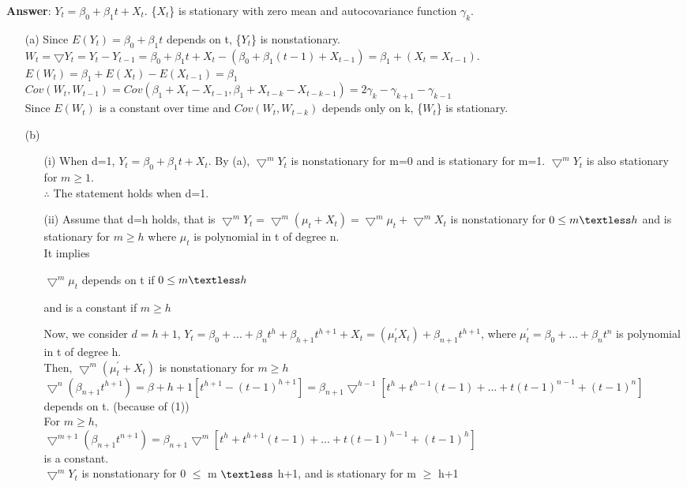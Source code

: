 {\bf Answer}:
$Y_t=\beta_0+\beta_1 t+X_t$.  \{$X_t$\} is stationary with zero mean and autocovariance function $\gamma_k$.
  \begin{itemize}
  \item[(a)] Since $E(Y_t)=\beta_0+\beta_1 t$ depends on t, \{$Y_t$\} is nonstationary.\\
  $W_t=\bigtriangledown Y_t=Y_t-Y_{t-1}=\beta_0+\beta_1 t+X_t-(\beta_0+\beta_1(t-1)+X_{t-1})=\beta_1+(X_t=X_{t-1})$.\\
  $E(W_t)=\beta_1+E(X_t)-E(X_{t-1})=\beta_1$\\
  $Cov(W_t,W_{t-1})=Cov(\beta_1+X_t-X_{t-1},\beta_1+X_{t-k}-X_{t-k-1})=2\gamma_k-\gamma_{k+1}-\gamma_{k-1}$\\

  Since $E(W_t)$ is a constant over time and $Cov(W_t,W_{t-k})$ depends only on k, \{$W_t$\} is stationary.
  
  \item[(b)]
  \begin{itemize}
  \item[(i)] When d=1, $Y_t=\beta_0+\beta_1 t+X_t$. By (a), $\bigtriangledown^{m} Y_t$ is nonstationary for m=0 and is stationary for m=1. $\bigtriangledown^{m} Y_t$ is also stationary for $m \geq 1$.\\  
  $\therefore$ The statement holds when d=1.
  
  \item[(ii)] Assume that d=h holds, that is $\bigtriangledown^{m} Y_t=\bigtriangledown^{m}(\mu_t+X_t)=\bigtriangledown^{m}\mu_t+\bigtriangledown^{m} X_t$ is nonstationary for $0 \leq m \textless h$ and is stationary for $m \geq h$ where $\mu_t$ is polynomial in t of degree n.\\  
  It implies
 	\begin{center}
 	    $\bigtriangledown^{m}\mu_t$  
 	depends on t if $0 \leq m \textless h$
    \end{center}
    \begin{center}
 		and is a constant if $m \geq h$ 
 	\end{center}
 	Now, we consider $d=h+1$, $Y_t=\beta_0+...+\beta_n t^{h}+\beta_{h+1} t^{h+1}+X_t=(\mu_t^{'} X_t)+\beta_{n+1} t^{h+1}$, where $\mu_t^{'}=\beta_0+...+\beta_n t^{n}$ is polynomial in t of degree h.\\  
 	Then, $\bigtriangledown^{m}(\mu_t^{'}+X_t)$ is nonstationary for $ m \geq h $ \\ 
 	$\bigtriangledown^{n}(\beta_{n+1} t^{h+1})=\beta+{h+1}[t^{h+1}-(t-1)^{h+1}]=\beta_{n+1}\bigtriangledown^{h-1}[t^{h}+t^{h-1}(t-1)+...
 	+t (t-1)^{n-1}+(t-1)^{n}]$  depends on t. (because of (1)) \\
 	For $m \geq h $,\\
 	$\bigtriangledown^{m+1}(\beta_{n+1} t^{n+1})=\beta_{n+1} \bigtriangledown^{m}[t^{h}+t^{h+1}(t-1)+...+t (t-1)^{h-1}+(t-1)^{h}]$\\
 	is a constant. \\ 
 	$\bigtriangledown^{m}Y_t$ is nonstationary for 0 $\leq$ m $\textless$ h+1, and is stationary for m $\geq$ h+1


\end{itemize}
\end{itemize}
